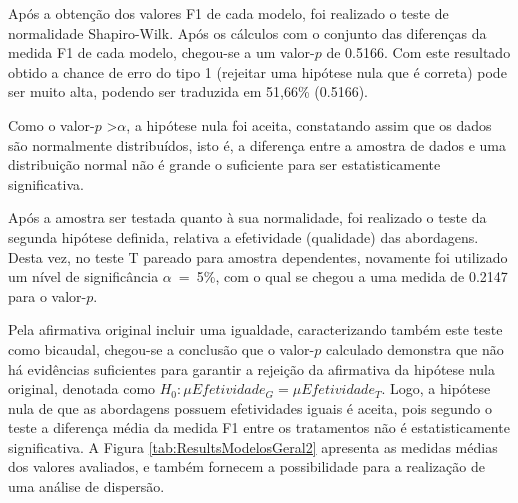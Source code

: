 Após a obtenção dos valores F1 de cada modelo, foi realizado o teste de normalidade Shapiro-Wilk.
Após os cálculos com o conjunto das diferenças da medida F1 de cada modelo, chegou-se a um valor-$p$ de 0.5166.
Com este resultado obtido a chance de erro do tipo 1 (rejeitar uma hipótese nula que é correta) pode ser muito alta, podendo ser traduzida em 51,66\% (0.5166).

Como o valor-$p$ \textgreater $\alpha$, a hipótese nula foi aceita, constatando assim que os dados são normalmente distribuídos, isto é, a diferença entre a amostra de dados e uma distribuição normal não é grande o suficiente para ser estatisticamente significativa.

Após a amostra ser testada quanto à sua normalidade, foi realizado o teste da segunda hipótese definida, relativa a efetividade (qualidade) das abordagens. 
Desta vez, no teste T pareado para amostra dependentes, novamente foi utilizado um nível de significância $\alpha$~=~5\%, com o qual se chegou a uma medida de 0.2147 para o valor-$p$. 

Pela afirmativa original incluir uma igualdade, caracterizando também este teste como bicaudal, chegou-se a conclusão que o valor-$p$ calculado demonstra que não há evidências suficientes para garantir a rejeição da afirmativa da hipótese nula original, denotada como $H_0 : \mu Efetividade_G = \mu Efetividade_T$.
Logo, a hipótese nula de que as abordagens possuem efetividades iguais é aceita, pois segundo o teste a diferença média da medida F1 entre os tratamentos não é estatisticamente significativa.
A Figura \ref{tab:ResultsModelosGeral2} apresenta as medidas médias dos valores avaliados, e também fornecem a possibilidade para a realização de uma análise de dispersão.

